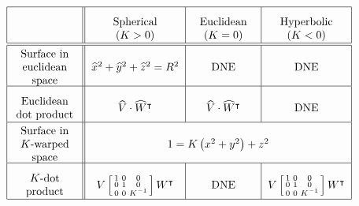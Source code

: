 \documentclass{ximera}
\begin{document}
\[
{\renewcommand{\arraystretch}{2.7}
  \begin{tabular}{|c||c|c|c|}\hline
    & \begin{minipage}{2cm}\begin{center}Spherical ($K>0$)\end{center}\end{minipage} & \begin{minipage}{2cm}\begin{center}Euclidean ($K=0$)\end{center}\end{minipage} & \begin{minipage}{2cm}\begin{center}Hyperbolic ($K<0$)\end{center}\end{minipage}\\\hline\hline
    \begin{minipage}{2cm}\begin{center}Surface in \\ euclidean space\end{center}\end{minipage} & $\hat{x}^{2}+\hat{y}^{2}+\hat{z}^{2}=R^{2}$ & DNE  & DNE \\\hline
    \begin{minipage}{2cm}\begin{center}Euclidean dot product\end{center}\end{minipage} & $\hat{V}\cdot \hat{W}^\transpose$ & $\hat{V}\cdot \hat{W}^\transpose$  & DNE\\\hline
     \begin{minipage}{2cm}\begin{center}Surface in $K$-warped space\end{center}\end{minipage} & \multicolumn{3}{c|}{$1=K\left(  x^{2}+y^{2}\right)  +z^{2}$}\\\hline
     \begin{minipage}{2cm}\begin{center}$K$-dot product\end{center}\end{minipage} & $V\left[\begin{smallmatrix}1 & 0 & 0\\ 0 & 1 & 0\\ 0 & 0 & K^{-1}\end{smallmatrix}\right] W^\transpose$ &  DNE & $V\left[\begin{smallmatrix}1 & 0 & 0\\ 0 & 1 & 0\\ 0 & 0 & K^{-1}\end{smallmatrix}\right]W^\transpose$\\\hline

\end{tabular}}\]
\end{document}
